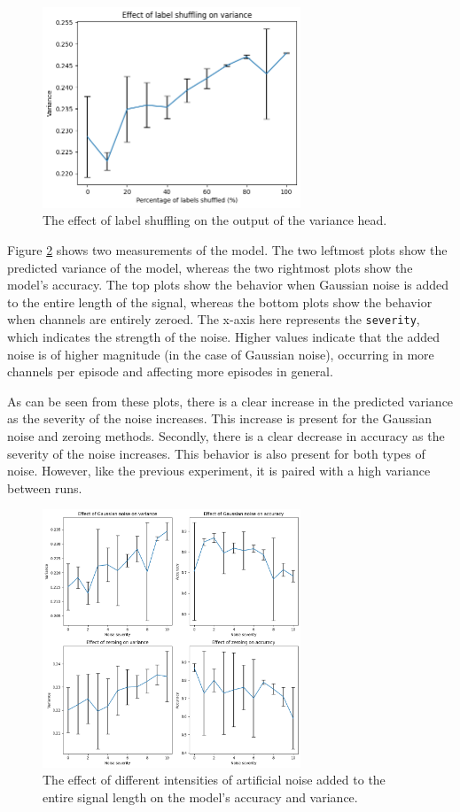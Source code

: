 \begin{figure}[!tbp]
    \centering
        \includegraphics[width=7.7cm]{img/label_shuffle.png}
    \caption{The effect of label shuffling on the output of the variance head.}
    \label{fig:label_shuffle}
\end{figure}


Figure \ref{fig:general} shows two measurements of the model. The two leftmost plots show the predicted variance of the model, whereas the two rightmost plots show the model's accuracy. The top plots show the behavior when Gaussian noise is added to the entire length of the signal, whereas the bottom plots show the behavior when channels are entirely zeroed. The x-axis here represents the \verb|severity|, which indicates the strength of the noise. Higher values indicate that the added noise is of higher magnitude (in the case of Gaussian noise), occurring in more channels per episode and affecting more episodes in general.

As can be seen from these plots, there is a clear increase in the predicted variance as the severity of the noise increases. This increase is present for the Gaussian noise and zeroing methods. Secondly, there is a clear decrease in accuracy as the severity of the noise increases. This behavior is also present for both types of noise. However, like the previous experiment, it is paired with a high variance between runs.

\begin{figure}[!tbp]
    \centering
        \includegraphics[width=7.7cm]{img/general.png}
    \caption{The effect of different intensities of artificial noise added to the entire signal length on the model's accuracy and variance.}
    \label{fig:general}
\end{figure}

